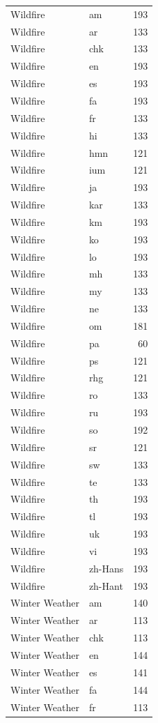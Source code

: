 \begin{longtable}{p{3cm} p{3cm} r}
Wildfire & am & 193 \\
Wildfire & ar & 133 \\
Wildfire & chk & 133 \\
Wildfire & en & 193 \\
Wildfire & es & 193 \\
Wildfire & fa & 193 \\
Wildfire & fr & 133 \\
Wildfire & hi & 133 \\
Wildfire & hmn & 121 \\
Wildfire & ium & 121 \\
Wildfire & ja & 193 \\
Wildfire & kar & 133 \\
Wildfire & km & 193 \\
Wildfire & ko & 193 \\
Wildfire & lo & 193 \\
Wildfire & mh & 133 \\
Wildfire & my & 133 \\
Wildfire & ne & 133 \\
Wildfire & om & 181 \\
Wildfire & pa & 60 \\
Wildfire & ps & 121 \\
Wildfire & rhg & 121 \\
Wildfire & ro & 133 \\
Wildfire & ru & 193 \\
Wildfire & so & 192 \\
Wildfire & sr & 121 \\
Wildfire & sw & 133 \\
Wildfire & te & 133 \\
Wildfire & th & 193 \\
Wildfire & tl & 193 \\
Wildfire & uk & 193 \\
Wildfire & vi & 193 \\
Wildfire & zh-Hans & 193 \\
Wildfire & zh-Hant & 193 \\
Winter Weather & am & 140 \\
Winter Weather & ar & 113 \\
Winter Weather & chk & 113 \\
Winter Weather & en & 144 \\
Winter Weather & es & 141 \\
Winter Weather & fa & 144 \\
Winter Weather & fr & 113 \\

\end{longtable}
